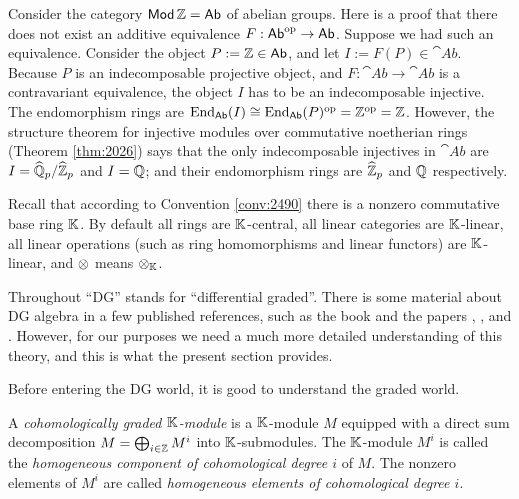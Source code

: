 \begin{exa} \label{exa:2990}
Consider the category $\operatorname{\mathsf{Mod}} \mathbb{Z} = \operatorname{\mathsf{Ab}}$ of abelian groups. 
Here is a proof that there does not exist an 
additive equivalence 
$F : \operatorname{\mathsf{Ab}}^{\mathrm{op}} \to \operatorname{\mathsf{Ab}}$.
Suppose we had such an equivalence. Consider the object 
$P := \mathbb{Z} \in \operatorname{\mathsf{Ab}}$, and let $I := F(P) \in \cat{Ab}$.
Because $P$ is an indecomposable projective object, and 
$F : \cat{Ab} \to \cat{Ab}$ is a contravariant equivalence,
the object $I$ has to be an indecomposable injective. 
The endomorphism rings are 
$\operatorname{End}_{\operatorname{\mathsf{Ab}}}(I) \cong \operatorname{End}_{\operatorname{\mathsf{Ab}}}(P)^{\mathrm{op}} = 
\mathbb{Z}^{\mathrm{op}} = \mathbb{Z}$.
However, the structure theorem for injective modules over commutative 
noetherian rings (Theorem \ref{thm:2026}) says that the only indecomposable 
injectives in $\cat{Ab}$ are $I = \widehat{\mathbb{Q}}_p / \widehat{\mathbb{Z}}_p$ and 
$I = \mathbb{Q}$; and their endomorphism rings are $\widehat{\mathbb{Z}}_p$ and $\mathbb{Q}$ respectively.
\end{exa}








\cleardoublepage
{} \label{sec:DG-algebra}

\AYcopyright

Recall that according to Convention \ref{conv:2490} 
there is a nonzero commutative base ring $\mathbb{K}$. By default all  
rings are $\mathbb{K}$-central, all linear categories are $\mathbb{K}$-linear,
all linear operations (such as ring homomorphisms and linear functors)
are $\mathbb{K}$-linear, and $\otimes$ means $\otimes_{\mathbb{K}}$. 

Throughout ``DG'' stands for ``differential graded''. 
There is some material about DG algebra in a few published references, such as
the book \cite{Mac1} and the papers \cite{Kel1}, \cite{To1}, \cite{Sao} and 
\cite{Avr}. However, for our 
purposes we need a much more detailed understanding of this theory, and this is 
what the present section provides. 


 \label{subsec:gr-alg}

Before entering the DG world, it is good to understand the graded world. 

\begin{dfn} \label{dfn:4101}
A {\em cohomologically graded $\mathbb{K}$-module}%
is a $\mathbb{K}$-module $M$ equipped with a direct sum decomposition
$M = \bigoplus_{i \in \mathbb{Z}} M^i$
into $\mathbb{K}$-submodules. The $\mathbb{K}$-module $M^i$ is called the {\em homogeneous 
component of cohomological degree $i$} of $M$. The nonzero elements of $M^i$ 
are called {\em homogeneous elements of cohomological degree $i$}. 
\end{dfn}

